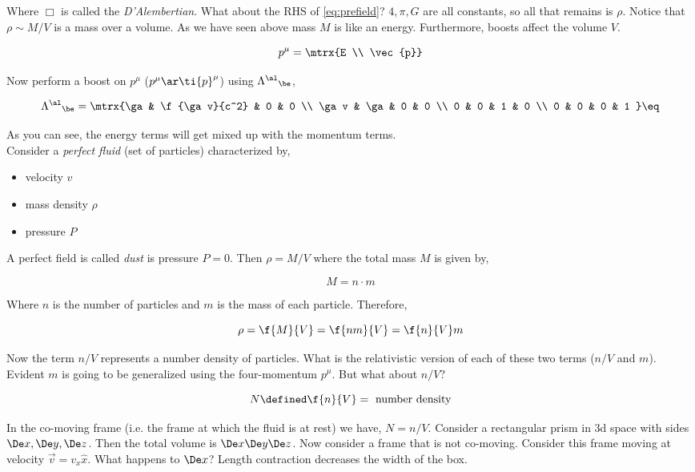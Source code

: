 \documentclass{article}
\begin{document}
Where $\Box$ is called the \textit{D'Alembertian}. What about the RHS of \eqref{eq:prefield}? $4,\pi,G$ are all constants, so all that remains is $\rho$. Notice that $\rho \sim M / V$ is a mass over a volume. As we have seen above mass $M$ is like an energy. Furthermore, boosts affect the volume $V$.

\[ p^\mu= \mtrx{E \\ \vec{p}} \]

Now perform a boost on $p^\mu$ ($p^\mu \ar \ti{p}^\mu$) using ${\Lam^{\al}}_\be$,

\[ {\Lam^{\al}}_\be = \mtrx{\ga & \f{\ga v}{c^2} & 0 & 0 \\ \ga v & \ga & 0 & 0  \\ 0 & 0 & 1 & 0  \\ 0 & 0 & 0 & 1 } \eq \label{eq:boost} \]

As you can see, the energy terms will get mixed up with the momentum terms. \\

Consider a \textit{perfect fluid} (set of particles) characterized by,
\begin{itemize}
    \item velocity $v$
    \item mass density $\rho$
    \item pressure $P$
\end{itemize}

A perfect field is called \textit{dust} is pressure $P = 0$. Then $\rho = M/V$ where the total mass $M$ is given by,

\[ M = n \cdot m \]

Where $n$ is the number of particles and $m$ is the mass of each particle. Therefore,

\[ \rho = \f{M}{V} = \f{nm}{V} = \f{n}{V} m \]

Now the term $n/V$ represents a number density of particles. What is the relativistic version of each of these two terms ($n/V$ and $m$). Evident $m$ is going to be generalized using the four-momentum $p^\mu$. But what about $n/V$?

\[ N \defined \f{n}{V} = \text{ number density} \]

In the co-moving frame (i.e. the frame at which the fluid is at rest) we have, $N = n/V$. Consider a rectangular prism in 3d space with sides $\De x, \De y, \De z$. Then the total volume is $\De x\De y\De z$. Now consider a frame that is not co-moving. Consider this frame moving at velocity $\vec{v} = v_x \hat{x}$. What happens to $\De x$? Length contraction decreases the width of the box.
\end{document}
